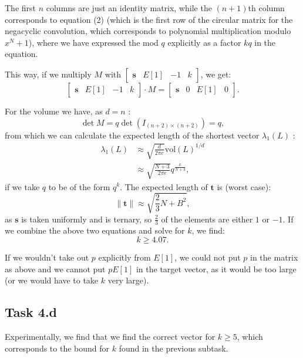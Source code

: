 \documentclass{article}
\begin{document}
\noindent The first $n$ columns are just an identity matrix, while the $(n+1)$th
column corresponds to equation (2) (which is the first row of the circular
matrix for the negacyclic convolution, which corresponds to polynomial
multiplication modulo $x^N + 1$), where we have expressed the mod $q$
explicitly as a factor $kq$ in the equation.

This way, if we multiply $M$ with $\begin{bmatrix} \mathbf{s} & E[1] & -1 & k
\end{bmatrix}$, we get:
\begin{equation}
  \begin{bmatrix} 
    \mathbf{s} & E[1] & -1 & k
  \end{bmatrix}
  \cdot M = 
  \begin{bmatrix} \mathbf{s} & 0 & E[1] & 0 \end{bmatrix}.
\end{equation}

\noindent For the volume we have, as $d = n$ :
\begin{equation}
  \det M = q \det(I_{(n + 2) \times (n + 2)}) = q,
\end{equation} 
from which we can calculate the expected length of the shortest vector $\lambda_1(L)$ : 
\begin{equation}
  \begin{split}
    \lambda_1(L) &\approx \sqrt{\frac{d}{2 \pi e}} \text{vol}(L)^{1 / d} \\
                 &\approx \sqrt{\frac{N+3}{2 \pi e}} q^{\frac{k}{N+3}},
  \end{split}
\end{equation} 
if we take $q$ to be of the form $q^k$. The expected length of $\mathbf{t}$ is
(worst case):
\begin{equation}
  \|\mathbf{t}\| \approx \sqrt{\frac{2}{3}N + B^2},
\end{equation}
as $\mathbf{s}$ is taken uniformly and is ternary, so $\frac{2}{3}$ of the
elements are either $1$ or $-1$. If we combine the above two equations and solve
for $k$, we find:
\begin{equation}
k \ge 4.07.
\end{equation} 

If we wouldn't take out $p$ explicitly from $E[1]$, we could not put $p$ in the
matrix as above and we cannot put $pE[1]$ in the target vector, as it would be
too large (or we would have to take $k$ very large).

\subsection*{Task 4.d}
Experimentally, we find that we find the correct vector for $k \ge 5$, which
corresponds to the bound for $k$ found in the previous subtask.
\end{document}
